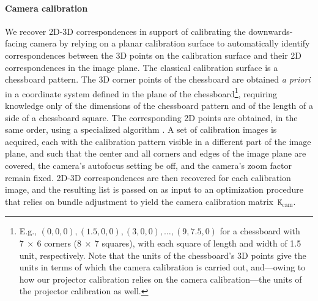 \documentclass[review]{elsarticle}
\begin{document}
\paragraph{Camera calibration} We recover 2D-3D correspondences in support of calibrating the downwards-facing camera by relying on a planar calibration surface to automatically identify correspondences between the 3D points on the calibration surface and their 2D correspondences in the image plane. The classical calibration surface is a chessboard pattern. The 3D corner points of the chessboard are obtained \textit{a priori} in a coordinate system defined in the plane of the chessboard\footnote{E.g., $(0,0,0), (1.5,0,0), (3,0,0), \dots, (9,7.5,0)$ for a chessboard with $7~\times{}~6$ corners ($8~\times{}~7$ squares), with each square of length and width of 1.5 unit, respectively. Note that the units of the chessboard's 3D points give the units in terms of which the camera calibration is carried out, and---owing to how our projector calibration relies on the camera calibration---the units of the projector calibration as well.}, requiring knowledge only of the dimensions of the chessboard pattern and of the length of a side of a chessboard square. The corresponding 2D points are obtained, in the same order, using a specialized algorithm \cite{bradski2000opencv}. A set of calibration images is acquired, each with the calibration pattern visible in a different part of the image plane, and such that the center and all corners and edges of the image plane are covered, the camera's autofocus setting be off, and the camera's zoom factor remain fixed. 2D-3D correspondences are then recovered for each calibration image, and the resulting list is passed on as input to an optimization procedure that relies on bundle adjustment to yield the camera calibration matrix~$\mathtt{K}_\text{cam}$. 
\end{document}
